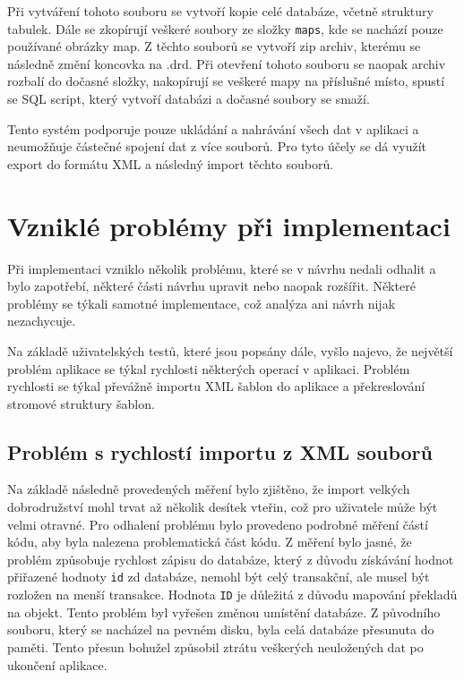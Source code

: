 \documentclass[thesis=B,czech]{resources/FITthesis}[2012/06/26]
\begin{document}
Při vytváření tohoto souboru se vytvoří kopie celé databáze, včetně struktury tabulek. Dále se zkopírují veškeré soubory ze složky \texttt{maps}, kde se nachází pouze používané obrázky map. Z těchto souborů se vytvoří zip archiv, kterému se následně změní koncovka na .drd. Při otevření tohoto souboru se naopak archiv rozbalí do dočasné složky, nakopírují se veškeré mapy na příslušné místo, spustí se SQL script, který vytvoří databázi a dočasné soubory se smaží. \par

Tento systém podporuje pouze ukládání a nahrávání všech dat v aplikaci a neumožňuje částečné spojení dat z více souborů. Pro tyto účely se dá využít export do formátu XML a následný import těchto souborů. 


\section{Vzniklé problémy při implementaci}
Při implementaci vzniklo několik problému, které se v návrhu nedali odhalit a bylo zapotřebí, některé části návrhu upravit nebo naopak rozšířit. Některé problémy se týkali samotné implementace, což analýza ani návrh nijak nezachycuje. \par 

Na základě uživatelských testů, které jsou popsány dále, vyšlo najevo, že největší problém aplikace se týkal rychlosti některých operací v aplikaci. Problém rychlosti se týkal převážně importu XML šablon do aplikace a překreslování stromové struktury šablon.

	\subsection{Problém s rychlostí importu z XML souborů}
Na základě následně provedených měření bylo zjištěno, že import velkých dobrodružství mohl trvat až několik desítek vteřin, což pro uživatele může být velmi otravné. Pro odhalení problému bylo provedeno podrobné měření částí kódu, aby byla nalezena problematická část kódu. Z měření bylo jasné, že problém způsobuje rychlost zápisu do databáze, který z důvodu získávání hodnot přiřazené hodnoty \texttt{id} zd databáze, nemohl být celý transakční, ale musel být rozložen na menší transakce. Hodnota \texttt{ID} je důležitá z důvodu mapování překladů na objekt. Tento problém byl vyřešen změnou umístění databáze. Z původního souboru, který se nacházel na pevném disku, byla celá databáze přesunuta do paměti. Tento přesun bohužel způsobil ztrátu veškerých neuložených dat po ukončení aplikace. \par 
\end{document}
